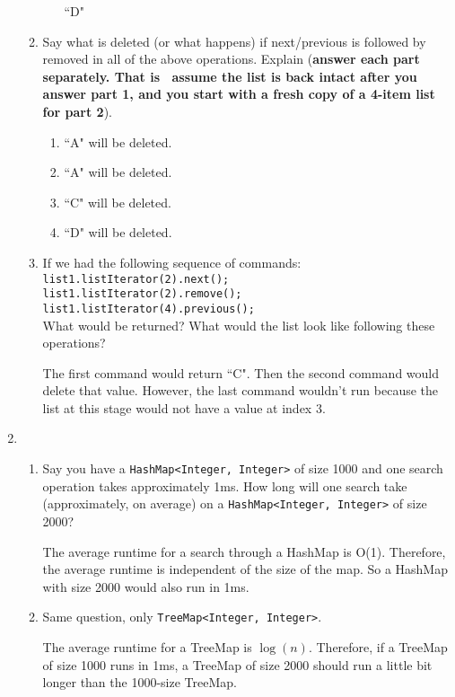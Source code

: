 \documentclass[letterpaper, 11pt]{article}
\begin{document}
\begin{enumerate}
\begin{enumerate}
\begin{enumerate}[label={\arabic*}. ]
            ``D"
        \end{enumerate}
        \item Say what is deleted (or what happens) if next/previous is followed by removed in all of the above operations. Explain (\textbf{answer each part separately. That is \texthorizontalbar\ assume the list is back intact after you answer part 1, and you start with a fresh copy of a 4-item list for part 2}).
        \begin{enumerate}[label={\arabic*}. ]
            \item ``A" will be deleted.
            \item ``A" will be deleted.
            \item ``C" will be deleted.
            \item ``D" will be deleted.
        \end{enumerate}
        \item If we had the following sequence of commands:\\
        \texttt{list1.listIterator(2).next();}\\
        \texttt{list1.listIterator(2).remove();}\\
        \texttt{list1.listIterator(4).previous();}\\
        What would be returned? What would the list look like following these operations?

        The first command would return ``C". Then the second command would delete that value. However, the last command wouldn't run because the list at this stage would not have a value at index 3.
    \end{enumerate}
    \item
    \begin{enumerate}
        \item Say you have a \texttt{HashMap<Integer, Integer>} of size 1000 and one search operation takes approximately 1ms. How long will one search take (approximately, on average) on a \texttt{HashMap<Integer, Integer>} of size 2000?

        The average runtime for a search through a HashMap is O(1). Therefore, the average runtime is independent of the size of the map. So a HashMap with size 2000 would also run in 1ms.
        
        \item Same question, only \texttt{TreeMap<Integer, Integer>}.

        The average runtime for a TreeMap is $\log(n)$. Therefore, if a TreeMap of size 1000 runs in 1ms, a TreeMap of size 2000 should run a little bit longer than the 1000-size TreeMap.
        

\end{enumerate}
\end{enumerate}
\end{document}
